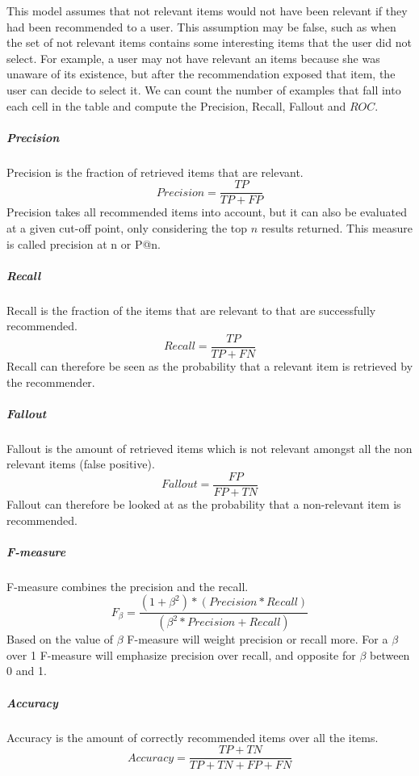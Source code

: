 This model assumes that not relevant items would not have been relevant if they had been
recommended to a user. This assumption may be false, such as when the set of
not relevant items contains some interesting items that the user did not select. For
example, a user may not have relevant an items because she was unaware of its
existence, but after the recommendation exposed that item, the user can decide
to select it. We can count the number of examples that fall into each cell in
the table and compute the Precision, Recall, Fallout and $ROC$.

\subparagraph{Precision}
Precision is the fraction of retrieved items that are relevant.
\begin{equation}
    Precision = \frac{TP}{TP+FP}
    \label{equation:precision}
\end{equation}
Precision takes all recommended items into account, but it can also be evaluated at a given cut-off point, only considering the top $n$ results returned. This measure is called precision at n or P@n.

\subparagraph{Recall}
Recall is the fraction of the items that are relevant to that are successfully recommended.
\begin{equation}
    Recall = \frac{TP}{TP+FN}
    \label{equation:recall}
\end{equation}
Recall can therefore be seen as the probability that a relevant item is retrieved by the recommender.

\subparagraph{Fallout}
Fallout is the amount of retrieved items which is not relevant amongst all the non relevant items (false positive).
\begin{equation}
    Fallout = \frac{FP}{FP+TN}
    \label{equation:fallout}
\end{equation}
Fallout can therefore be looked at as the probability that a non-relevant item is recommended.

\subparagraph{F-measure}
F-measure combines the precision and the recall.
\begin{equation}
    F_\beta = \frac{(1 + \beta^2) * (Precision * Recall)}{(\beta^2 * Precision + Recall)}
    \label{equation:f-measure}
\end{equation}
Based on the value of $\beta$ F-measure will weight precision or recall more. For a $\beta$ over 1 F-measure will emphasize precision over recall, and opposite for $\beta$ between 0 and 1.

\subparagraph{Accuracy}
Accuracy is the amount of correctly recommended items over all the items.
\begin{equation}
    Accuracy = \frac{TP+TN}{TP+TN+FP+FN}
    \label{equation:accuracy}
\end{equation}

